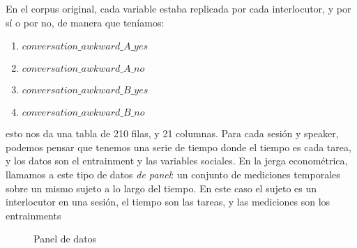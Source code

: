 En el corpus original, cada variable estaba replicada por cada interlocutor, y por sí o por no, de manera que teníamos:

\begin{enumerate}
  \item $conversation\_awkward\_A\_yes$
  \item $conversation\_awkward\_A\_no$
  \item $conversation\_awkward\_B\_yes$
  \item $conversation\_awkward\_B\_no$
\end{enumerate}


esto nos da una tabla de 210 filas, y 21 columnas. Para cada sesión y speaker, podemos pensar que tenemos una serie de tiempo donde el tiempo es cada tarea, y los datos son el entrainment y las variables sociales. En la jerga econométrica, llamamos a este tipo de datos \emph{de panel}\cite{gujarati1999}: un conjunto de mediciones temporales sobre un mismo sujeto a lo largo del tiempo. En este caso el sujeto es un interlocutor en una sesión, el tiempo son las tareas, y las mediciones son los entrainments


\begin{figure}
\centering

\caption{Panel de datos}
\label{panel_data}
\end{figure}
